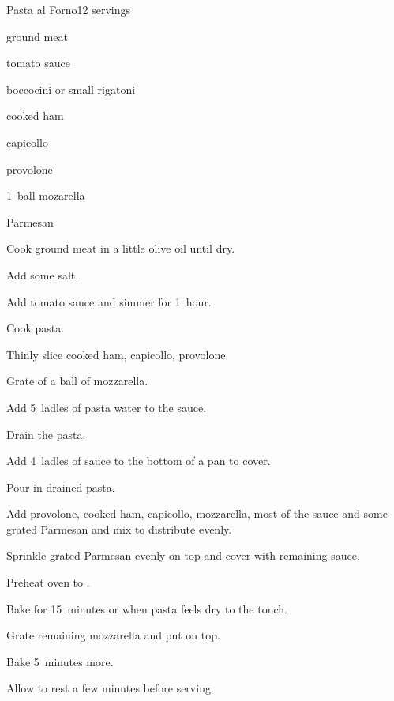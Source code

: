 \begin{recipe}{Pasta al Forno}{}{12 servings}

\begin{ingredients}
\item \lbs{1\half} ground meat
\item {} tomato sauce
\item {} boccocini or small rigatoni
\item {} cooked ham
\item {} capicollo
\item {} provolone
\item 1~ball mozarella
\item Parmesan
\end{ingredients}

\begin{directions}
\item Cook ground meat in a little olive oil until dry.
\item Add some salt.
\item Add tomato sauce and simmer for 1~hour.
\item Cook pasta.
\item Thinly slice cooked ham, capicollo, provolone.
\item Grate \threequarter{} of a ball of mozzarella.
\item Add 5~ladles of pasta water to the sauce.
\item Drain the pasta.
\item Add 4~ladles of sauce to the bottom of a pan to cover.
\item Pour in drained pasta.
\item Add provolone, cooked ham, capicollo, mozzarella, most of the sauce and some grated Parmesan and mix to distribute evenly.
\item Sprinkle grated Parmesan evenly on top and cover with remaining sauce.
\item Preheat oven to .
\item Bake for 15~minutes or when pasta feels dry to the touch.
\item Grate remaining mozzarella and put on top.
\item Bake 5~minutes more.
\item Allow to rest a few minutes before serving.
\end{directions}

\end{recipe}
